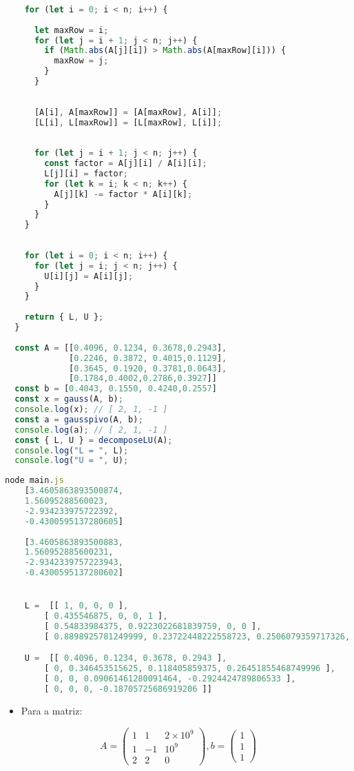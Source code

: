 \documentclass{article}
\begin{document}
\begin{lstlisting}[language=JavaScript, caption=Métodos de eliminação de Gauss e Gauss com pivotamento.]
    
    for (let i = 0; i < n; i++) {
      
      let maxRow = i;
      for (let j = i + 1; j < n; j++) {
        if (Math.abs(A[j][i]) > Math.abs(A[maxRow][i])) {
          maxRow = j;
        }
      }
  
      
      [A[i], A[maxRow]] = [A[maxRow], A[i]];
      [L[i], L[maxRow]] = [L[maxRow], L[i]];
  
      
      for (let j = i + 1; j < n; j++) {
        const factor = A[j][i] / A[i][i];
        L[j][i] = factor;
        for (let k = i; k < n; k++) {
          A[j][k] -= factor * A[i][k];
        }
      }
    }
  
    
    for (let i = 0; i < n; i++) {
      for (let j = i; j < n; j++) {
        U[i][j] = A[i][j];
      }
    }
  
    return { L, U };
  }
  
  const A = [[0.4096, 0.1234, 0.3678,0.2943],
             [0.2246, 0.3872, 0.4015,0.1129],
             [0.3645, 0.1920, 0.3781,0.0643],
             [0.1784,0.4002,0.2786,0.3927]]
  const b = [0.4043, 0.1550, 0.4240,0.2557]
  const x = gauss(A, b);
  console.log(x); // [ 2, 1, -1 ]
  const a = gausspivo(A, b);
  console.log(a); // [ 2, 1, -1 ]
  const { L, U } = decomposeLU(A);
  console.log("L = ", L);
  console.log("U = ", U);
  \end{lstlisting}
  \begin{lstlisting}[language=JavaScript, caption=Execussão do codido]
    node main.js
    [3.4605863893500874,
    1.56095288560023,  
    -2.934233975722392,
    -0.4300595137280605]
    
    [3.4605863893500883, 
    1.560952885600231,  
    -2.9342339757223943,
    -0.4300595137280602]


    L =  [[ 1, 0, 0, 0 ],
        [ 0.435546875, 0, 0, 1 ],
        [ 0.54833984375, 0.9223022681839759, 0, 0 ],
        [ 0.8898925781249999, 0.23722448222558723, 0.2506079359717326, 0 ]]

    U =  [[ 0.4096, 0.1234, 0.3678, 0.2943 ],
        [ 0, 0.346453515625, 0.118405859375, 0.26451855468749996 ],
        [ 0, 0, 0.09061461280091464, -0.2924424789806533 ],
        [ 0, 0, 0, -0.18705725686919206 ]]
  \end{lstlisting}
   \bigskip
 \begin{itemize}
  \item Para a matriz:
 \end{itemize}
 \begin{equation*}
  A=\begin{pmatrix}
    1 & 1 &2\times 10^{9} \\ 
     1& -1 & 10^{9}\\ 
     2& 2 & 0
    \end{pmatrix},
   b= \begin{pmatrix}
      1\\1\\1
    \end{pmatrix}
 \end{equation*}
\end{document}
